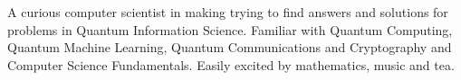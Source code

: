 

\begin{cvparagraph}


A curious computer scientist in making trying to find answers and solutions for problems in Quantum Information Science. Familiar with Quantum Computing, Quantum Machine Learning, Quantum Communications and Cryptography and Computer Science Fundamentals. Easily excited by mathematics, music and tea.

\end{cvparagraph}
